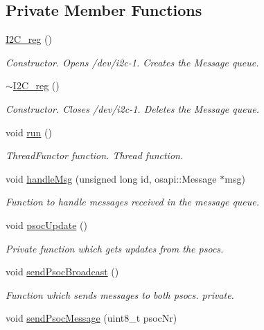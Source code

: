 \subsection*{Private Member Functions}
\begin{DoxyCompactItemize}
\item 
\hyperlink{class_i2_c__reg_a720b6a4c79f5065acd067e0c97ba4d72}{I2\+C\+\_\+reg} ()
\begin{DoxyCompactList}\small\item\em Constructor. Opens /dev/i2c-\/1. Creates the Message queue. \end{DoxyCompactList}\item 
\hyperlink{class_i2_c__reg_aaeda24970f812b2f805abb71f3e55489}{$\sim$\+I2\+C\+\_\+reg} ()
\begin{DoxyCompactList}\small\item\em Constructor. Closes /dev/i2c-\/1. Deletes the Message queue. \end{DoxyCompactList}\item 
void \hyperlink{class_i2_c__reg_abc05f4c53d60cb63152b9fbdc0c38c23}{run} ()
\begin{DoxyCompactList}\small\item\em Thread\+Functor function. Thread function. \end{DoxyCompactList}\item 
void \hyperlink{class_i2_c__reg_a21a1711d4835a287dde1d08e9e39279d}{handle\+Msg} (unsigned long id, osapi\+::\+Message $\ast$msg)
\begin{DoxyCompactList}\small\item\em Function to handle messages received in the message queue. \end{DoxyCompactList}\item 
void \hyperlink{class_i2_c__reg_a55154e2f02004d6485c32a9e5f1b2d61}{psoc\+Update} ()
\begin{DoxyCompactList}\small\item\em Private function which gets updates from the psocs. \end{DoxyCompactList}\item 
void \hyperlink{class_i2_c__reg_acd34d2f4e7768e262772828f980b933b}{send\+Psoc\+Broadcast} ()
\begin{DoxyCompactList}\small\item\em Function which sends messages to both psocs. private. \end{DoxyCompactList}\item 
void \hyperlink{class_i2_c__reg_ac69b2184dc49d8b097bebde346e56783}{send\+Psoc\+Message} (uint8\+\_\+t psoc\+Nr)

\end{DoxyCompactItemize}
